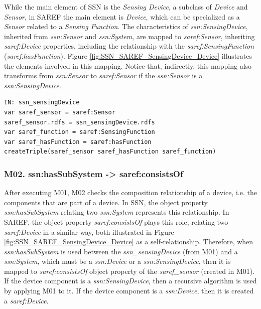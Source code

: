 \documentclass{sig-alternate-05-2015}
\begin{document}
While the main element of SSN is the \textit{Sensing Device}, a subclass of \textit{Device} and \textit{Sensor}, in SAREF the main element is \textit{Device}, which can be specialized as a \textit{Sensor} related to a \textit{Sensing Function}. The characteristics of \textit{ssn:\-SensingDevice}, inherited from \textit{ssn:\-Sensor} and \textit{ssn:\-System}, are mapped to \textit{saref:\-Sensor}, inheriting \textit{saref:\-Device} properties, including the relationship with the \textit{saref:\-SensingFunction} (\textit{saref:\-hasFunction}). Figure \ref{fig:SSN_SAREF_SensingDevice_Device} illustrates the elements involved in this mapping. Notice that, indirectly, this mapping also transforms from \textit{ssn:\-Sensor} to \textit{saref:\-Sensor} if the \textit{ssn:\-Sensor} is a \textit{ssn:\-SensingDevice}.

\begin{lstlisting}[caption={Pseudocode snippet for M01},label={code:sample},captionpos=b]
IN: ssn_sensingDevice
var saref_sensor = saref:Sensor  
saref_sensor.rdfs = ssn_sensingDevice.rdfs    
var saref_function = saref:SensingFunction  
var saref_hasFunction = saref:hasFunction  
createTriple(saref_sensor saref_hasFunction saref_function)

\end{lstlisting}

\subsubsection{M02. ssn:\-hasSubSystem -> saref:\-consistsOf}

After executing M01, M02 checks the composition relationship of a device, i.e. the components that are part of a device. In SSN, the object property \textit{ssn:\-hasSubSystem} relating two \textit{ssn:\-System} represents this relationship. In SAREF, the object property \textit{saref:\-consistsOf} plays this role, relating two \textit{saref:\-Device} in a similar way, both illustrated in Figure \ref{fig:SSN_SAREF_SensingDevice_Device} as a self-relationship. Therefore, when \textit{ssn:\-hasSubSystem} is used between the \textit{ssn\_sensingDevice} (from M01) and a \textit{ssn:\-System}, which must be a \textit{ssn:\-Device} or a \textit{ssn:\-SensingDevice}, then it is mapped to \textit{saref:\-consistsOf} object property of the \textit{saref\_sensor} (created in M01). If the device component is a \textit{ssn:\-SensingDevice}, then a recursive algorithm is used by applying M01 to it. If the device component is a \textit{ssn:\-Device}, then it is created a \textit{saref:\-Device}. 
\end{document}
